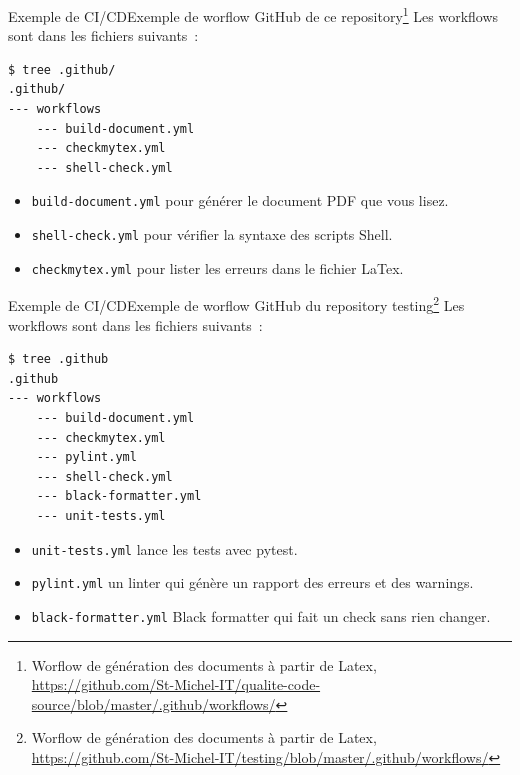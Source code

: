 \documentclass{beamer}
\begin{document}
    \begin{frame}[fragile]{Exemple de CI/CD}{Exemple de worflow GitHub de ce repository{\footnote{Worflow de génération des documents à partir de Latex, \url{https://github.com/St-Michel-IT/qualite-code-source/blob/master/.github/workflows/}}}}
        \transdissolve
        Les workflows sont dans les fichiers suivants~:
        \begin{lstlisting}[language=sh]
$ tree .github/
.github/
--- workflows
    --- build-document.yml
    --- checkmytex.yml
    --- shell-check.yml
        \end{lstlisting}
        \begin{itemize}
            \item \lstinline{build-document.yml} pour générer le document PDF que vous lisez.
            \item \lstinline{shell-check.yml} pour vérifier la syntaxe des scripts Shell.
            \item \lstinline{checkmytex.yml} pour lister les erreurs dans le fichier LaTex.
        \end{itemize}
    \end{frame}

    \begin{frame}[fragile]{Exemple de CI/CD}{Exemple de worflow GitHub du repository testing{\footnote{Worflow de génération des documents à partir de Latex, \url{https://github.com/St-Michel-IT/testing/blob/master/.github/workflows/}}}}
        \transdissolve
        Les workflows sont dans les fichiers suivants~:
        \begin{lstlisting}[language=sh]
$ tree .github
.github
--- workflows
    --- build-document.yml
    --- checkmytex.yml
    --- pylint.yml
    --- shell-check.yml
    --- black-formatter.yml
    --- unit-tests.yml
        \end{lstlisting}
        \begin{itemize}
            \item \lstinline{unit-tests.yml} lance les tests avec pytest.
            \item \lstinline{pylint.yml} un linter qui génère un rapport des erreurs et des warnings.
            \item \lstinline{black-formatter.yml} Black formatter qui fait un check sans rien changer.
        \end{itemize}
    \end{frame}
\end{document}
